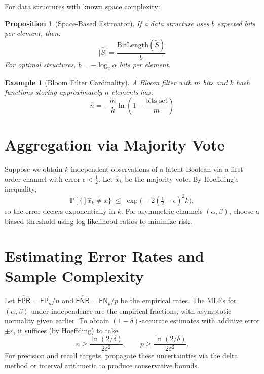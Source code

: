 \documentclass[11pt,final,hidelinks]{article}
\newtheorem{proposition}[theorem]{Proposition}
\newtheorem{example}[theorem]{Example}
\newcommand{\obs}[1]{\widetilde{#1}}  %
\newcommand{\Prob}[1]{\mathbb{P}\left[#1\right]}
\newcommand{\FP}{\mathsf{FP}}  %
\newcommand{\FN}{\mathsf{FN}}  %
\newcommand{\FPR}{\mathsf{FPR}}  %
\newcommand{\FNR}{\mathsf{FNR}}  %
\newcommand{\fprate}{\alpha}
\newcommand{\fnrate}{\beta}
\begin{document}
For data structures with known space complexity:

\begin{proposition}[Space-Based Estimator]
If a data structure uses $b$ expected bits per element, then:
\begin{equation}
\hat{|S|} = \frac{\text{BitLength}(\obs{S})}{b}
\end{equation}
For optimal structures, $b = -\log_2 \fprate$ bits per element.
\end{proposition}

\begin{example}[Bloom Filter Cardinality]
A Bloom filter with $m$ bits and $k$ hash functions storing approximately $n$ elements has:
\begin{equation}
\hat{n} = -\frac{m}{k} \ln\left(1 - \frac{\text{bits set}}{m}\right)
\end{equation}
\end{example}

\section{Aggregation via Majority Vote}

Suppose we obtain $k$ independent observations of a latent Boolean via a first-order channel with error $\epsilon<\tfrac12$. Let $\hat{x}_k$ be the majority vote. By Hoeffding's inequality,
\begin{equation}
\Prob\{\hat{x}_k \neq x\} \;\le\; \exp\bigl(-2(\tfrac12-\epsilon)^2 k\bigr),
\end{equation}
so the error decays exponentially in $k$. For asymmetric channels $(\fprate,\fnrate)$, choose a biased threshold using log-likelihood ratios to minimize risk.

\section{Estimating Error Rates and Sample Complexity}

Let $\widehat{\FPR}=\FP_n/n$ and $\widehat{\FNR}=\FN_p/p$ be the empirical rates. The MLEs for $(\fprate,\fnrate)$ under independence are the empirical fractions, with asymptotic normality given earlier. To obtain $(1-\delta)$-accurate estimates with additive error $\pm \varepsilon$, it suffices (by Hoeffding) to take
\begin{equation}
 n \ge \frac{\ln(2/\delta)}{2\varepsilon^2},\qquad p \ge \frac{\ln(2/\delta)}{2\varepsilon^2}.
\end{equation}
For precision and recall targets, propagate these uncertainties via the delta method or interval arithmetic to produce conservative bounds.
\end{document}
